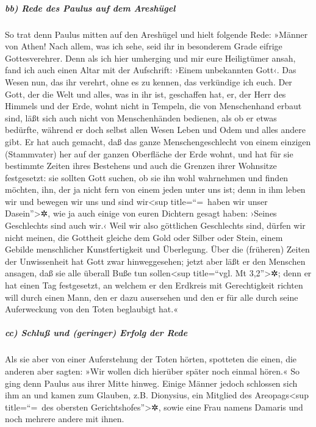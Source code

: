 \hypertarget{bb-rede-des-paulus-auf-dem-areshuxfcgel}{%
\subparagraph{bb) Rede des Paulus auf dem
Areshügel}\label{bb-rede-des-paulus-auf-dem-areshuxfcgel}}

 So trat denn Paulus mitten auf den Areshügel und hielt
folgende Rede: »Männer von Athen! Nach allem, was ich sehe, seid ihr in
besonderem Grade eifrige Gottesverehrer.  Denn als ich
hier umherging und mir eure Heiligtümer ansah, fand ich auch einen Altar
mit der Aufschrift: ›Einem unbekannten Gott‹. Das Wesen nun, das ihr
verehrt, ohne es zu kennen, das verkündige ich euch.  Der
Gott, der die Welt und alles, was in ihr ist, geschaffen hat, er, der
Herr des Himmels und der Erde, wohnt nicht in Tempeln, die von
Menschenhand erbaut sind,  läßt sich auch nicht von
Menschenhänden bedienen, als ob er etwas bedürfte, während er doch
selbst allen Wesen Leben und Odem und alles andere gibt. 
Er hat auch gemacht, daß das ganze Menschengeschlecht von einem einzigen
(Stammvater) her auf der ganzen Oberfläche der Erde wohnt, und hat für
sie bestimmte Zeiten ihres Bestehens und auch die Grenzen ihrer
Wohnsitze festgesetzt:  sie sollten Gott suchen, ob sie
ihn wohl wahrnehmen und finden möchten, ihn, der ja nicht fern von einem
jeden unter uns ist;  denn in ihm leben wir und bewegen
wir uns und sind wir\textless sup title=``=~haben wir unser
Dasein''\textgreater✲, wie ja auch einige von euren Dichtern gesagt
haben: ›Seines Geschlechts sind auch wir.‹  Weil wir also
göttlichen Geschlechts sind, dürfen wir nicht meinen, die Gottheit
gleiche dem Gold oder Silber oder Stein, einem Gebilde menschlicher
Kunstfertigkeit und Überlegung.  Über die (früheren)
Zeiten der Unwissenheit hat Gott zwar hinweggesehen; jetzt aber läßt er
den Menschen ansagen, daß sie alle überall Buße tun sollen\textless sup
title=``vgl. Mt 3,2''\textgreater✲;  denn er hat einen
Tag festgesetzt, an welchem er den Erdkreis mit Gerechtigkeit richten
will durch einen Mann, den er dazu ausersehen und den er für alle durch
seine Auferweckung von den Toten beglaubigt hat.«

\hypertarget{cc-schluuxdf-und-geringer-erfolg-der-rede}{%
\subparagraph{cc) Schluß und (geringer) Erfolg der
Rede}\label{cc-schluuxdf-und-geringer-erfolg-der-rede}}

 Als sie aber von einer Auferstehung der Toten hörten,
spotteten die einen, die anderen aber sagten: »Wir wollen dich hierüber
später noch einmal hören.«  So ging denn Paulus aus ihrer
Mitte hinweg.  Einige Männer jedoch schlossen sich ihm an
und kamen zum Glauben, z.B. Dionysius, ein Mitglied des
Areopags\textless sup title=``=~des obersten
Gerichtshofes''\textgreater✲, sowie eine Frau namens Damaris und noch
mehrere andere mit ihnen.

